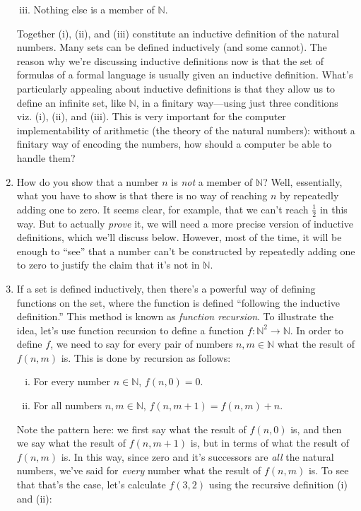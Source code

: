 \begin{enumerate}[{\thesection}.1]
\begin{enumerate}[(i)]
		\setcounter{enumii}{2}
	
		\item Nothing else is a member of $\mathbb{N}$.
	
	\end{enumerate}
Together (i), (ii), and (iii) constitute an inductive definition of the natural numbers. Many sets can be defined inductively (and some cannot). The reason why we're discussing inductive definitions now is that the set of formulas of a formal language is usually given an inductive definition. What's particularly appealing about inductive definitions is that they allow us to define an infinite set, like $\mathbb{N}$, in a finitary way---using just three conditions viz. (i), (ii), and (iii). This is very important for the computer implementability of arithmetic (the theory of the natural numbers): without a finitary way of encoding the numbers, how should a computer be able to handle them?

	\item How do you show that a number $n$ is \emph{not} a member of $\mathbb{N}$? Well, essentially, what you have to show is that there is no way of reaching $n$ by repeatedly adding one to zero. It seems clear, for example, that we can't reach $\frac{1}{2}$ in this way. But to actually \emph{prove} it, we will need a more precise version of inductive definitions, which we'll discuss below. However, most of the time, it will be enough to ``see'' that a number can't be constructed by repeatedly adding one to zero to justify the claim that it's not in $\mathbb{N}$.
	
	\item If a set is defined inductively, then there's a powerful way of defining functions on the set, where the function is defined ``following the inductive definition.'' This method is known as \emph{function recursion}. To illustrate the idea, let's use function recursion to define a function $f:\mathbb{N}^2\to\mathbb{N}$. In order to define $f$, we need to say for every pair of numbers $n,m\in\mathbb{N}$ what the result of $f(n,m)$ is. This is done by recursion as follows:
	\begin{enumerate}[(i)]
	
		\item For every number $n\in\mathbb{N}$, $f(n, 0)=0$.
		
		\item For all numbers $n,m\in\mathbb{N}$, $f(n,m+1)=f(n,m)+n$.
	
	\end{enumerate}
Note the pattern here: we first say what the result of $f(n,0)$ is, and then we say what the result of $f(n,m+1)$ is, but in terms of what the result of $f(n,m)$ is. In this way, since zero and it's successors are \emph{all} the natural numbers, we've said for \emph{every} number what the result of $f(n,m)$ is. To see that that's the case, let's calculate $f(3,2)$ using the recursive definition (i) and (ii):


\end{enumerate}
